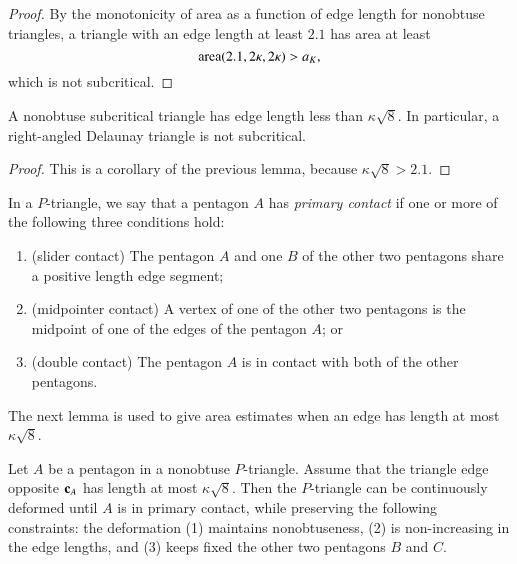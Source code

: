 \begin{proof} By the monotonicity of area as a function of edge length
  for nonobtuse triangles, a triangle with an edge length at least
  $2.1$ has area at least
\[
{\operatorname{area}}(2.1,2\kappa,2\kappa) > a_K,
\] %
which is not subcritical.
\end{proof}

\begin{lemma} 
  A nonobtuse subcritical triangle has edge length less than
  $\kappa\sqrt8$.  In particular, a right-angled Delaunay triangle is
  not subcritical.
\end{lemma}

\begin{proof}  
This is a corollary of the previous lemma, because $\kappa\sqrt8 >
2.1$.
%
\end{proof}


\begin{definition}
In a $P$-triangle, we say that a pentagon $A$ has {\it primary
  contact} if one or more of the following three conditions hold:
\begin{enumerate}
\item (slider contact) The pentagon $A$ and one $B$ of the other two pentagons
share a positive length edge segment;
\item (midpointer contact)  A vertex of one of the other two pentagons
is  the midpoint of one of the edges of the pentagon $A$; or
\item (double contact) The pentagon $A$ is in contact
with both of the other pentagons.
\end{enumerate}
\end{definition}

The next lemma is used to give area
estimates when an edge has length at most $\kappa\sqrt{8}$.

\begin{lemma} 
  Let $A$ be a pentagon in a nonobtuse $P$-triangle.  Assume that the
  triangle edge opposite ${\mathbf c}_A$ has length at most $\kappa\sqrt{8}$.
  Then the $P$-triangle can be continuously deformed until $A$ is in
  primary contact, while preserving the following constraints: the
  deformation (1) maintains nonobtuseness, (2) is non-increasing in
  the edge lengths, and (3) keeps fixed the other two pentagons $B$
  and $C$.
\end{lemma}

